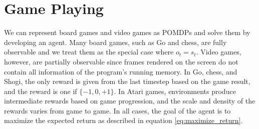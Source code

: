 \section{Game Playing}
We can represent board games and video games as POMDPs and solve them by developing an agent.
Many board games, such as Go and chess, are fully observable and we treat them as the special case where $o_t = s_t$.
Video games, however, are partially observable since frames rendered on the screen do not contain all information of the program's running memory.
In Go, chess, and Shogi, the only reward is given from the last timestep based on the game result, and the reward is one if $\{-1, 0, +1\}$.
In Atari games, environments produce intermediate rewards based on game progression, and the scale and density of the rewards varies from game to game.
In all cases, the goal of the agent is to maximize the expected return as described in equation \ref{eq:maximize_return}.




